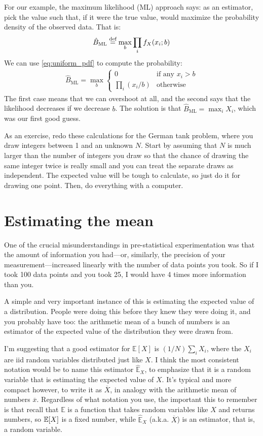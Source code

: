 For our example, the maximum likelihood (ML) approach says: as an estimator, pick
the value such that, if it were the true value, would maximize the probability
density of the observed data. That is:
\begin{equation}
\hat{B}_\text{ML} \stackrel{\text{def}}{=} \max_b \prod_i f_X(x_i; b)
\end{equation}
We can use \eqref{eq:uniform_pdf} to compute the probability:
\begin{align*}
\hat{B}_\text{ML} = \max_b \begin{cases}
0 &\text{if any $x_i > b$} \\
\prod_i (x_i/b) &\text{otherwise}
\end{cases}
\end{align*}
The first case means that we can overshoot at all, and the second says that
the likelihood decreases if we decrease $b$. The solution is that
$\hat{B}_\text{ML} = \max_i X_i$, which was our first good guess.

As an exercise, redo these calculations for the German tank problem, where you
draw integers between 1 and an unknown $N$. Start by assuming that $N$ is much
larger than the number of integers you draw so that the chance of drawing the
same integer twice is really small and you can treat the separate draws as
independent. The expected value will be tough to calculate, so just do it for
drawing one point. Then, do everything with a computer.

\section{Estimating the mean}

One of the crucial misunderstandings in pre-statistical experimentation was
that the amount of information you had---or, similarly, the precision of your
measurement---increased linearly with the number of data points you took. So
if I took 100 data points and you took 25, I would have 4 times more
information than you.

A simple and very important instance of this is estimating the expected value
of a distribution. People were doing this before they knew they were doing it,
and you probably have too: the arithmetic mean of a bunch of numbers is an
estimator of the expected value of the distribution they were drawn from.

I'm suggesting that a good estimator for $\mathbb{E}[X]$ is $(1/N)\sum_i X_i$,
where the $X_i$ are iid random variables distributed just like $X$. I think
the most consistent notation would be to name this estimator
$\hat{\mathbb{E}}_X$, to emphasize that it is a random variable that is
estimating the expected value of $X$. It's typical and more compact however,
to write it as $\overline{X}$, in analogy with the arithmetic mean of numbers
$\overline{x}$. Regardless of what notation you use, the important this to
remember is that recall that $\mathbb{E}$ is a function that takes random
variables like $X$ and returns numbers, so $\mathbb{E}\!\left[{X}\right]$ is a fixed number,
while $\hat{\mathbb{E}}_X$ (a.k.a. $\overline{X}$) is an estimator, that is, a
random variable.

